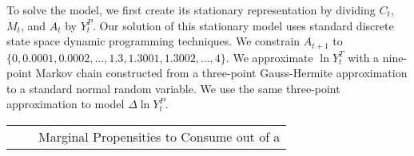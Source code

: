 \documentclass[fleqccn,12pt]{article}
\begin{document}
To solve the model, we first create its stationary representation by dividing $C_t$, $M_t$, and $A_{t}$ by $Y_{t}^P$. Our solution of this stationary model uses standard discrete state space dynamic programming techniques. We constrain $A_{t+1}$ to $\{0,0.0001,0.0002,\ldots,1.3,1.3001,1.3002,\ldots,4\}$. We approximate $\ln Y_t^{T}$ with a nine-point Markov chain constructed from a three-point Gauss-Hermite approximation to a standard normal random variable. We use the same three-point approximation to model $\Delta \ln Y_t^P$.

\begin{table}
\begin{center}

\begin{tabular}{rccccc}
& \multicolumn{1}{c}{} & \multicolumn{4}{c}{Marginal Propensities to Consume out of a } \\ 


\end{tabular}
\end{center}
\end{table}
\end{document}
